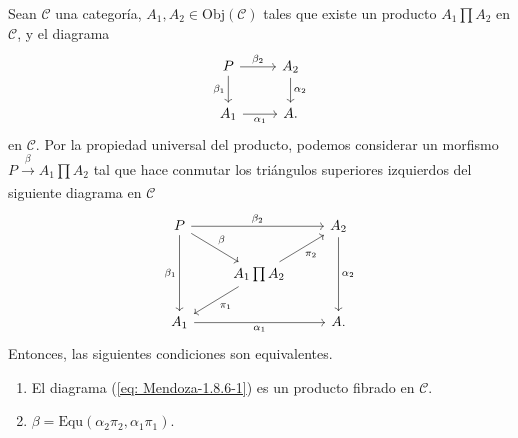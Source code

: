 \documentclass[tesis]{subfiles}
\begin{document}
\begin{Prop}\label{Mendoza-1.8.6}
    Sean $\mathscr{C}$ una categoría, $A_1,A_2\in\text{Obj}(\mathscr{C})$ tales que existe un producto $A_1\prod A_2$ en $\mathscr{C}$, y el diagrama
    \begin{equation}\label{eq: Mendoza-1.8.6-1}
        \begin{tikzcd}
            P \arrow[]{d}[swap]{\beta_1} \arrow[]{r}[]{\beta_2} &A_2 \arrow[]{d}[]{\alpha_2} \\
            A_1 \arrow[]{r}[swap]{\alpha_1} &A.
        \end{tikzcd}
    \end{equation}
    en $\mathscr{C}$. Por la propiedad universal del producto, podemos considerar un morfismo $P\xrightarrow[]{\beta}A_1\prod A_2$ tal que hace conmutar los triángulos superiores izquierdos del siguiente diagrama en $\mathscr{C}$
    \begin{equation}\label{eq: Mendoza-1.8.6-2}
        \begin{tikzcd}
            P \arrow[]{dd}[swap]{\beta_1} \arrow[]{rr}[]{\beta_2} \arrow[]{dr}[]{\beta} &&A_2 \arrow[]{dd}[]{\alpha_2} \\
                                                                                        &A_1\prod A_2 \arrow[]{dl}[]{\pi_1} \arrow[]{ur}[swap]{\pi_2} \\
            A_1 \arrow[]{rr}[swap]{\alpha_1} &&A.
        \end{tikzcd}
    \end{equation}
    Entonces, las siguientes condiciones son equivalentes.

    \begin{enumerate}[label=(\alph*)]
    
        \item El diagrama (\ref{eq: Mendoza-1.8.6-1}) es un producto fibrado en $\mathscr{C}$.

        \item $\beta = \text{Equ}(\alpha_2\pi_2,\alpha_1\pi_1)$.
    \end{enumerate}
\end{Prop}
\end{document}
